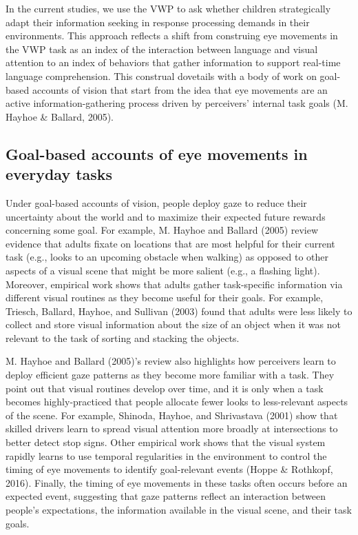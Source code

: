 \documentclass[,man,floatsintext]{apa6}
\begin{document}
In the current studies, we use the VWP to ask whether children
strategically adapt their information seeking in response processing
demands in their environments. This approach reflects a shift from
construing eye movements in the VWP task as an index of the interaction
between language and visual attention to an index of behaviors that
gather information to support real-time language comprehension. This
construal dovetails with a body of work on goal-based accounts of vision
that start from the idea that eye movements are an active
information-gathering process driven by perceivers' internal task goals
(M. Hayhoe \& Ballard, 2005).

\subsection{Goal-based accounts of eye movements in everyday
tasks}\label{goal-based-accounts-of-eye-movements-in-everyday-tasks}

Under goal-based accounts of vision, people deploy gaze to reduce their
uncertainty about the world and to maximize their expected future
rewards concerning some goal. For example, M. Hayhoe and Ballard (2005)
review evidence that adults fixate on locations that are most helpful
for their current task (e.g., looks to an upcoming obstacle when
walking) as opposed to other aspects of a visual scene that might be
more salient (e.g., a flashing light). Moreover, empirical work shows
that adults gather task-specific information via different visual
routines as they become useful for their goals. For example, Triesch,
Ballard, Hayhoe, and Sullivan (2003) found that adults were less likely
to collect and store visual information about the size of an object when
it was not relevant to the task of sorting and stacking the objects.

M. Hayhoe and Ballard (2005)'s review also highlights how perceivers
learn to deploy efficient gaze patterns as they become more familiar
with a task. They point out that visual routines develop over time, and
it is only when a task becomes highly-practiced that people allocate
fewer looks to less-relevant aspects of the scene. For example, Shinoda,
Hayhoe, and Shrivastava (2001) show that skilled drivers learn to spread
visual attention more broadly at intersections to better detect stop
signs. Other empirical work shows that the visual system rapidly learns
to use temporal regularities in the environment to control the timing of
eye movements to identify goal-relevant events (Hoppe \& Rothkopf,
2016). Finally, the timing of eye movements in these tasks often occurs
before an expected event, suggesting that gaze patterns reflect an
interaction between people's expectations, the information available in
the visual scene, and their task goals.
\end{document}

